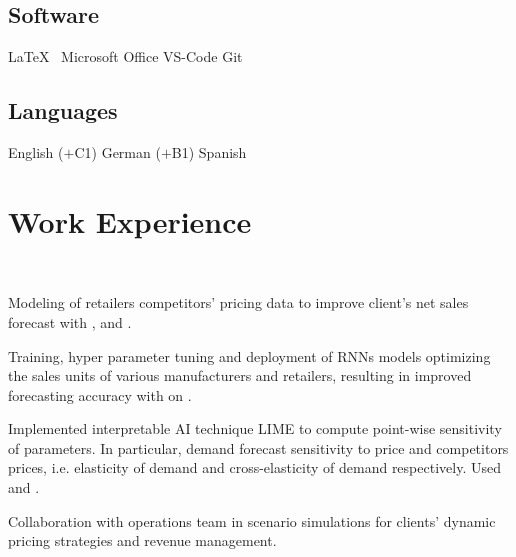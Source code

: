 \documentclass[]{deedy-resume-openfont}
\begin{document}
\begin{minipage}[t]{0.32\textwidth}
\subsection{Software}
\LaTeX\ \textbullet{} Microsoft Office \textbullet{} VS-Code \textbullet{} Git
\sectionsep

\subsection{Languages}
English ($+$C1) \textbullet{} German ($+$B1) \textbullet{} Spanish

%
%

\end{minipage} 
\hfill
\begin{minipage}[t]{0.66\textwidth} 


\section{Work Experience}
\\
\vspace{\topsep} %
\begin{tightemize}
\item Modeling of retailers competitors' pricing data to improve client's net sales forecast with ,  and . 
\item Training, hyper parameter tuning and deployment of RNNs models optimizing the sales units of various manufacturers and retailers, resulting in improved forecasting accuracy with  on . 
\item Implemented interpretable AI technique LIME to compute point-wise sensitivity of parameters. In particular, demand forecast sensitivity to price and competitors prices, i.e. elasticity of demand and cross-elasticity of demand respectively. Used  and .
\item Collaboration with operations team in scenario simulations for clients' dynamic pricing strategies and revenue management.
\end{tightemize}
\sectionsep


\end{minipage}
\end{document}
